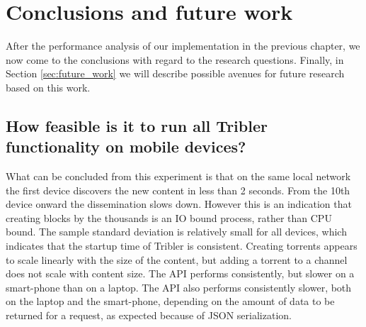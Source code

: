 \chapter{Conclusions and future work}\label{ch:conclusions}
After the performance analysis of our implementation in the previous chapter, we now come to the conclusions with regard to the research questions.
Finally, in Section \ref{sec:future_work} we will describe possible avenues for future research based on this work.


\section{How feasible is it to run all Tribler functionality on mobile devices?} %

What can be concluded from this experiment is that on the same local network the first device discovers the new content in less than 2 seconds.
From the 10th device onward the dissemination slows down.
However this is an indication that creating blocks by the thousands is an IO bound process, rather than CPU bound.
The sample standard deviation is relatively small for all devices, which indicates that the startup time of Tribler is consistent.
Creating torrents appears to scale linearly with the size of the content, but adding a torrent to a channel does not scale with content size.
The API performs consistently, but slower on a smart-phone than on a laptop.
The API also performs consistently slower, both on the laptop and the smart-phone, depending on the amount of data to be returned for a request, as expected because of JSON serialization.












